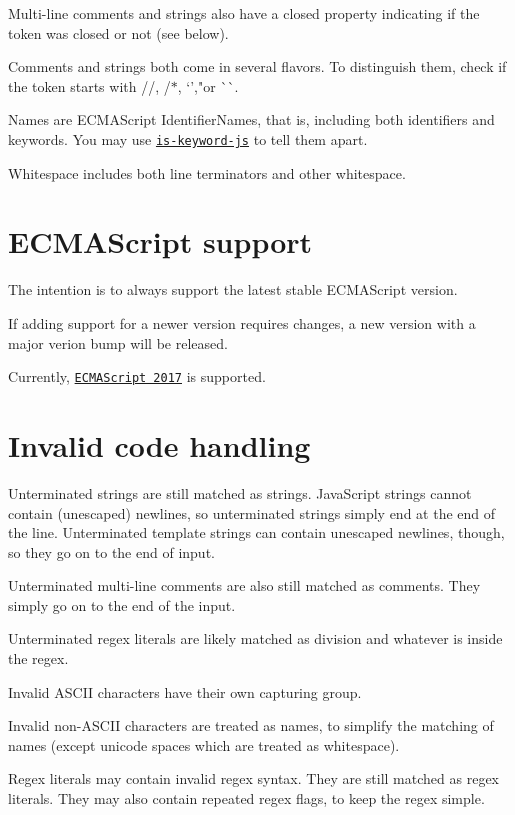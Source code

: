 Multi-\/line comments and strings also have a {\ttfamily closed} property indicating if the token was closed or not (see below).

Comments and strings both come in several flavors. To distinguish them, check if the token starts with {\ttfamily //}, {\ttfamily /$\ast$}, `'{\ttfamily ,}"{\ttfamily or} \`{}\`{}.

Names are E\+C\+M\+A\+Script Identifier\+Names, that is, including both identifiers and keywords. You may use \href{https://github.com/crissdev/is-keyword-js}{\tt is-\/keyword-\/js} to tell them apart.

Whitespace includes both line terminators and other whitespace.

\section*{E\+C\+M\+A\+Script support }

The intention is to always support the latest stable E\+C\+M\+A\+Script version.

If adding support for a newer version requires changes, a new version with a major verion bump will be released.

Currently, \href{https://www.ecma-international.org/ecma-262/8.0/index.html}{\tt E\+C\+M\+A\+Script 2017} is supported.

\section*{Invalid code handling }

Unterminated strings are still matched as strings. Java\+Script strings cannot contain (unescaped) newlines, so unterminated strings simply end at the end of the line. Unterminated template strings can contain unescaped newlines, though, so they go on to the end of input.

Unterminated multi-\/line comments are also still matched as comments. They simply go on to the end of the input.

Unterminated regex literals are likely matched as division and whatever is inside the regex.

Invalid A\+S\+C\+II characters have their own capturing group.

Invalid non-\/\+A\+S\+C\+II characters are treated as names, to simplify the matching of names (except unicode spaces which are treated as whitespace).

Regex literals may contain invalid regex syntax. They are still matched as regex literals. They may also contain repeated regex flags, to keep the regex simple.

